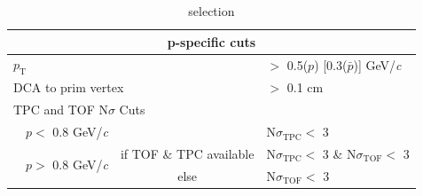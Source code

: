 \documentclass[../AnalysisNoteJBuxton.tex]{subfiles}
\begin{document}
\begin{table}[htbp]
\begin{tabular}{lc|c|l}
   
   \multicolumn{4}{c}{\textbf{p-specific cuts}} \\
   \hline
   \multicolumn{3}{l|}{$p_{\mathrm{T}}$} & $ > $ 0.5($p$) [0.3($\bar{p}$)] GeV/\textit{c} \\
   \hline
   \multicolumn{3}{l|}{DCA to prim vertex} & $>$ 0.1 cm \\
   \hline
   \multicolumn{4}{l}{TPC and TOF N$\sigma$ Cuts} \\
   \hline
    & \multicolumn{1}{c}{$p <$ 0.8 GeV/\textit{c}} & & N$\sigma_{\mathrm{TPC}} <$ 3 \\
   \hline
    & \multirow{2}{*}{$p >$ 0.8 GeV/\textit{c}} &  if TOF \& TPC available & N$\sigma_{\mathrm{TPC}} <$ 3 \& N$\sigma_{\mathrm{TOF}} <$ 3 \\
   \cline{3-4}
    & & else & N$\sigma_{\mathrm{TOF}} <$ 3 \\
   \hline   
  \end{tabular}
 \caption{\Lam selection}
 \label{tab:LamCuts} 
\end{table}
\end{document}
